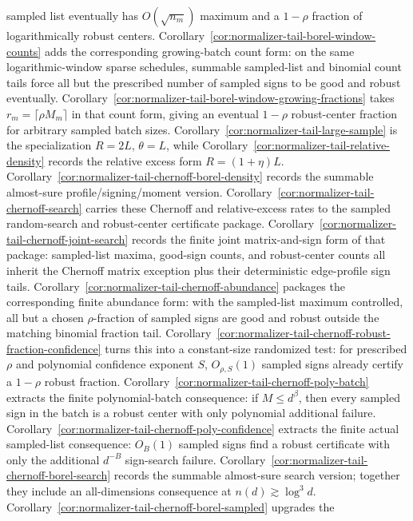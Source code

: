 \documentclass[11pt]{amsart}
\numberwithin{equation}{section}
\theoremstyle{definition}
\theoremstyle{remark}
\begin{document}
sampled list eventually has \(O(\sqrt{n_m})\) maximum and a \(1-\rho\) fraction
of logarithmically robust centers.
Corollary~\ref{cor:normalizer-tail-borel-window-counts} adds the corresponding
growing-batch count form: on the same logarithmic-window sparse schedules,
summable sampled-list and binomial count tails force all but the prescribed
number of sampled signs to be good and robust eventually.
Corollary~\ref{cor:normalizer-tail-borel-window-growing-fractions} takes
\(r_m=\lceil\rho M_m\rceil\) in that count form, giving an eventual
\(1-\rho\) robust-center fraction for arbitrary sampled batch sizes.
Corollary~\ref{cor:normalizer-tail-large-sample}
is the specialization \(R=2L\), \(\theta=L\), while
Corollary~\ref{cor:normalizer-tail-relative-density} records the relative
excess form \(R=(1+\eta)L\).
Corollary~\ref{cor:normalizer-tail-chernoff-borel-density} records the summable
almost-sure profile/signing/moment version.
Corollary~\ref{cor:normalizer-tail-chernoff-search} carries these Chernoff and
relative-excess rates to the sampled random-search and robust-center certificate
package.
Corollary~\ref{cor:normalizer-tail-chernoff-joint-search} records the finite
joint matrix-and-sign form of that package: sampled-list maxima, good-sign
counts, and robust-center counts all inherit the Chernoff matrix exception plus
their deterministic edge-profile sign tails.
Corollary~\ref{cor:normalizer-tail-chernoff-abundance} packages the corresponding
finite abundance form: with the sampled-list maximum controlled, all but a
chosen \(\rho\)-fraction of sampled signs are good and robust outside the
matching binomial fraction tail.
Corollary~\ref{cor:normalizer-tail-chernoff-robust-fraction-confidence} turns
this into a constant-size randomized test: for prescribed \(\rho\) and
polynomial confidence exponent \(S\), \(O_{\rho,S}(1)\) sampled signs already
certify a \(1-\rho\) robust fraction.
Corollary~\ref{cor:normalizer-tail-chernoff-poly-batch} extracts the finite
polynomial-batch consequence: if \(M\le d^\beta\), then every sampled sign in
the batch is a robust center with only polynomial additional failure.
Corollary~\ref{cor:normalizer-tail-chernoff-poly-confidence} extracts the
finite actual sampled-list consequence: \(O_B(1)\) sampled signs find a robust
certificate with only the additional \(d^{-B}\) sign-search failure.
Corollary~\ref{cor:normalizer-tail-chernoff-borel-search} records the summable
almost-sure search version; together they include an all-dimensions consequence
at \(n(d)\gtrsim\log^3 d\).
Corollary~\ref{cor:normalizer-tail-chernoff-borel-sampled} upgrades the
\end{document}

